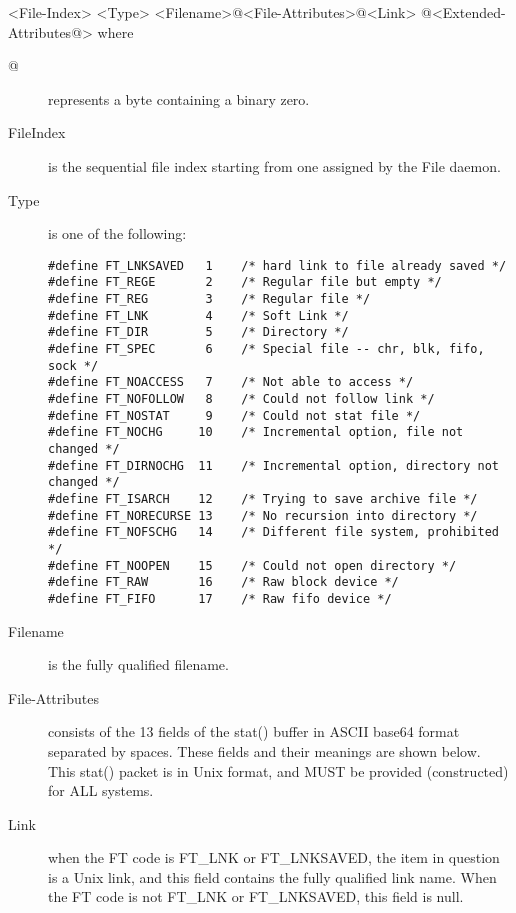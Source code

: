 {\textless}File-Index{\textgreater} {\textless}Type{\textgreater}
{\textless}Filename{\textgreater}@{\textless}File-Attributes{\textgreater}@{\textless}Link{\textgreater}
@{\textless}Extended-Attributes@{\textgreater} where

\begin{description}

\item [@]
   represents a byte containing a binary zero.

\item [FileIndex]
   is the sequential file index starting from one assigned  by the File daemon.

\item [Type]
   is one of the following:

\footnotesize
\begin{verbatim}
#define FT_LNKSAVED   1    /* hard link to file already saved */
#define FT_REGE       2    /* Regular file but empty */
#define FT_REG        3    /* Regular file */
#define FT_LNK        4    /* Soft Link */
#define FT_DIR        5    /* Directory */
#define FT_SPEC       6    /* Special file -- chr, blk, fifo, sock */
#define FT_NOACCESS   7    /* Not able to access */
#define FT_NOFOLLOW   8    /* Could not follow link */
#define FT_NOSTAT     9    /* Could not stat file */
#define FT_NOCHG     10    /* Incremental option, file not changed */
#define FT_DIRNOCHG  11    /* Incremental option, directory not changed */
#define FT_ISARCH    12    /* Trying to save archive file */
#define FT_NORECURSE 13    /* No recursion into directory */
#define FT_NOFSCHG   14    /* Different file system, prohibited */
#define FT_NOOPEN    15    /* Could not open directory */
#define FT_RAW       16    /* Raw block device */
#define FT_FIFO      17    /* Raw fifo device */
\end{verbatim}
\normalsize

\item [Filename]
   is the fully qualified filename.

\item [File-Attributes]
   consists of the 13 fields of the stat() buffer in  ASCII base64 format
separated by spaces. These fields  and their meanings are shown below. This
stat() packet is in Unix  format, and MUST be provided (constructed) for ALL
systems.

\item [Link]
   when the FT code is FT\_LNK or FT\_LNKSAVED, the item in  question is a Unix
link, and this field contains the fully  qualified link name. When the FT code
is not FT\_LNK or  FT\_LNKSAVED, this field is null.


\end{description}
